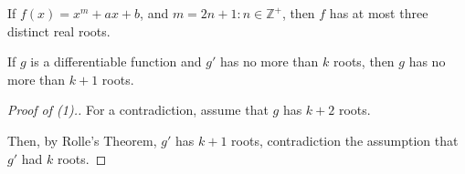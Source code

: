\documentclass[../hw4.tex]{subfiles}
\begin{document}




\begin{proposition}%
    If $f(x) = x^m+ax+b$, and $m = 2n+1 : n \in \mathbb{Z}^+$, then $f$ has at most three distinct real roots.
\end{proposition}

\begin{proposition}[1]
    If $g$ is a differentiable function and $g'$ has no more than $k$ roots, then $g$ has no more than $k+1$ roots.
\end{proposition}

\begin{proof}[Proof of (1).]
    For a contradiction, assume that $g$ has $k+2$ roots.

    Then, by Rolle's Theorem, $g'$ has $k+1$ roots, contradiction the assumption that $g'$ had $k$ roots.
\end{proof}
\end{document}
